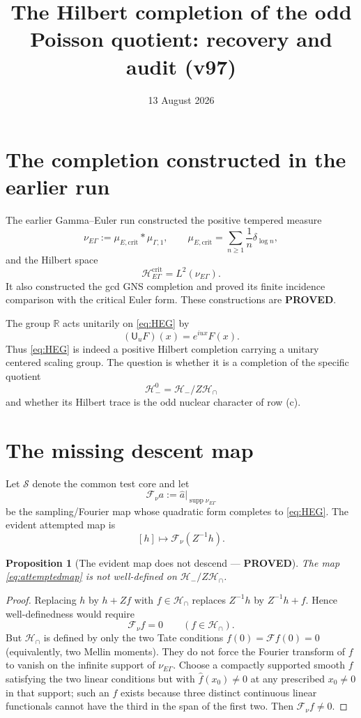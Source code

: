 \documentclass[11pt]{article}
\title{The Hilbert completion of the odd Poisson quotient: recovery and audit (v97)}
\date{13 August 2026}
\newcommand{\PROVED}{\textcolor{green!40!black}{\textbf{PROVED}}}
\newtheorem{proposition}{Proposition}
\begin{document}
\maketitle

\section{The completion constructed in the earlier run}

The earlier Gamma--Euler run constructed the positive tempered measure
\[
 \nu_{E\Gamma}:=\mu_{E,\mathrm{crit}}*\mu_{\Gamma,1},
 \qquad
 \mu_{E,\mathrm{crit}}=\sum_{n\ge1}\frac1n\delta_{\log n},
\]
and the Hilbert space
\begin{equation}\label{eq:HEG}
 \mathscr H_{E\Gamma}^{\mathrm{crit}}=L^2(\nu_{E\Gamma}).
\end{equation}
It also constructed the gcd GNS completion and proved its finite incidence
comparison with the critical Euler form.  These constructions are \PROVED.

The group $\mathbb R$ acts unitarily on \eqref{eq:HEG} by
\[
 (\mathsf U_uF)(x)=e^{iux}F(x).
\]
Thus \eqref{eq:HEG} is indeed a positive Hilbert completion carrying a
unitary centered scaling group.  The question is whether it is a completion
of the specific quotient
\[
 \mathcal H_-^0=\mathcal H_-/Z\mathcal H_\cap
\]
and whether its Hilbert trace is the odd nuclear character of row (c).

\section{The missing descent map}

Let $\mathcal S$ denote the common test core and let
\[
 \mathcal F_\nu a:=\widehat a\big|_{\operatorname{supp}\nu_{E\Gamma}}
\]
be the sampling/Fourier map whose quadratic form completes to
\eqref{eq:HEG}.  The evident attempted map is
\begin{equation}\label{eq:attemptedmap}
 [h]\longmapsto \mathcal F_\nu(Z^{-1}h).
\end{equation}

\begin{proposition}[The evident map does not descend --- \PROVED]
The map \eqref{eq:attemptedmap} is not well-defined on
$\mathcal H_-/Z\mathcal H_\cap$.
\end{proposition}

\begin{proof}
Replacing $h$ by $h+Zf$ with $f\in\mathcal H_\cap$ replaces
$Z^{-1}h$ by $Z^{-1}h+f$.  Hence well-definedness would require
\[
 \mathcal F_\nu f=0\qquad(f\in\mathcal H_\cap).
\]
But $\mathcal H_\cap$ is defined by only the two Tate conditions
$f(0)=\mathcal Ff(0)=0$ (equivalently, two Mellin moments).  They do not
force the Fourier transform of $f$ to vanish on the infinite support of
$\nu_{E\Gamma}$.  Choose a compactly supported smooth $f$ satisfying the two
linear conditions but with $\widehat f(x_0)\ne0$ at any prescribed
$x_0\ne0$ in that support; such an $f$ exists because three distinct
continuous linear functionals cannot have the third in the span of the first
two.  Then $\mathcal F_\nu f\ne0$.
\end{proof}
\end{document}
